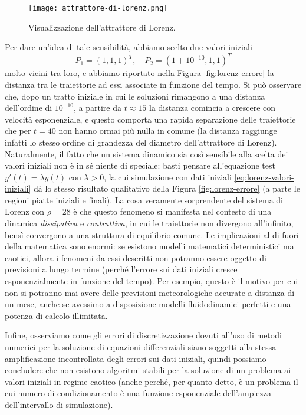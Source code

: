 \begin{figure}[tbp]
\centering
\texttt{[image: attrattore-di-lorenz.png]}
\vspace{1em}
\caption{Visualizzazione dell'attrattore di Lorenz.}
\label{fig:attrattore-di-lorenz}
\end{figure}

Per dare un'idea di tale sensibilità, abbiamo scelto due valori iniziali
\begin{equation} \label{eq:lorenz-valori-iniziali}
P_1 = (1,1,1)^T, \quad P_2 = (1+10^{-10},1,1)^T
\end{equation}
molto vicini tra loro, e abbiamo riportato nella Figura \ref{fig:lorenz-errore}
la distanza tra le traiettorie ad essi associate in funzione del tempo.
Si può osservare che, dopo un tratto iniziale in cui le soluzioni rimangono
a una distanza dell'ordine di $10^{-10}$, a partire da $t \approx 15$
la distanza comincia a crescere con velocità esponenziale, e questo comporta
una rapida separazione delle traiettorie che per $t = 40$ non hanno ormai più nulla
in comune (la distanza raggiunge infatti lo stesso ordine di grandezza del diametro
dell'attrattore di Lorenz).
Naturalmente, il fatto che un sistema dinamico sia così sensibile
alla scelta dei valori iniziali non è in sé niente di speciale: basti pensare
all'equazione test $y'(t) = \lambda y(t)$ con $\lambda > 0$, la cui simulazione
con dati iniziali \ref{eq:lorenz-valori-iniziali} dà lo stesso risultato
qualitativo della Figura \ref{fig:lorenz-errore} (a parte le regioni piatte
iniziali e finali). La cosa veramente sorprendente del sistema di Lorenz con $\rho = 28$
è che questo fenomeno si manifesta nel contesto di una dinamica \emph{dissipativa}
e \emph{contrattiva}, in cui le traiettorie non divergono all'infinito,
bensì convergono a una struttura di equilibrio comune.
Le implicazioni al di fuori della matematica sono enormi: se esistono
modelli matematici deterministici ma caotici, allora i fenomeni da essi
descritti non potranno essere oggetto di previsioni a lungo termine
(perché l'errore sui dati iniziali cresce esponenzialmente in funzione del tempo).
Per esempio, questo è il motivo per cui non si potranno mai avere delle previsioni
meteorologiche accurate a distanza di un mese, anche se avessimo a disposizione
modelli fluidodinamici perfetti e una potenza di calcolo illimitata.

Infine, osserviamo come gli errori di discretizzazione dovuti all'uso
di metodi numerici per la soluzione di equazioni differenziali siano
soggetti alla stessa amplificazione incontrollata degli errori sui dati
iniziali, quindi possiamo concludere che non esistono algoritmi stabili
per la soluzione di un problema ai valori iniziali in regime caotico
(anche perché, per quanto detto, è un problema il cui numero di condizionamento
è una funzione esponenziale dell'ampiezza dell'intervallo di simulazione).

